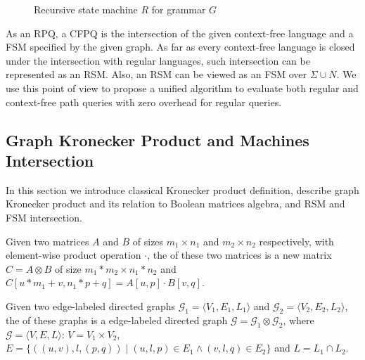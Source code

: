\begin{figure}[h]
    \centering
    \caption{Recursive state machine $R$ for grammar $G$}
    \label{example:automata}
\end{figure}


As an RPQ, a CFPQ is the intersection of the given context-free language and a FSM specified by the given graph.
As far as every context-free language is closed under the intersection with regular languages, such intersection can be represented as an RSM.
Also, an RSM can be viewed as an FSM over $\Sigma \cup N$.
We use this point of view to propose a unified algorithm to evaluate both regular and context-free path queries with zero overhead for regular queries.

\subsection{Graph Kronecker Product and Machines Intersection}

In this section we introduce classical Kronecker product definition,
describe graph Kronecker product and its relation to Boolean matrices algebra,
and RSM and FSM intersection.

\begin{definition}
Given two matrices $A$ and $B$ of sizes $m_1 \times n_1$ and $m_2 \times n_2$
respectively, with element-wise product operation $\cdot$, the  of these two matrices is a new matrix $C = A \otimes B$ of size $m_1 * m_2 \times n_1 * n_2$ and $C[u * m_1 + v,n_1 * p + q] = A[u,p] \cdot B[v,q]$.
\end{definition}

\begin{definition}
\label{def:graph:product}
Given two edge-labeled directed graphs $\mathcal{G}_1=\langle V_1, E_1, L_1 \rangle$
and $\mathcal{G}_2=\langle V_2, E_2, L_2 \rangle$,
the  of these graphs is a edge-labeled directed graph
$\mathcal{G}=\mathcal{G}_1 \otimes \mathcal{G}_2$,
where $\mathcal{G}= \langle V, E, L \rangle$:  $V = V_1 \times V_2$, $E = \{((u,v),l,(p,q)) \mid (u,l,p) \in E_1 \wedge (v,l,q) \in E_2 \}$ and $L = L_1 \cap L_2$.
\end{definition}

